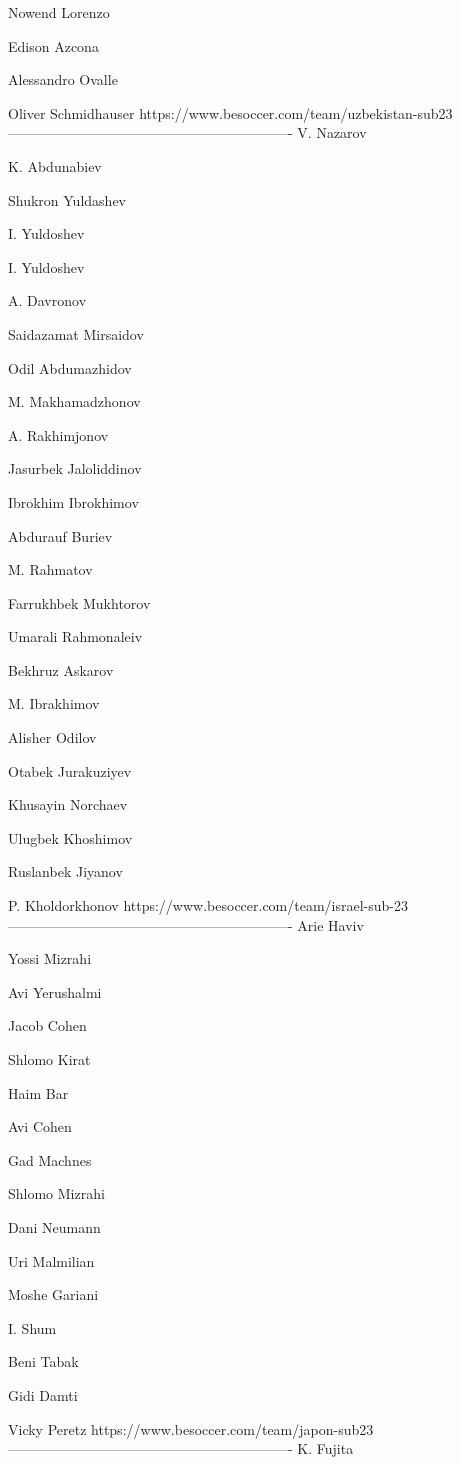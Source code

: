 Nowend Lorenzo

Edison Azcona

Alessandro Ovalle

Oliver Schmidhauser
https://www.besoccer.com/team/uzbekistan-sub23 
-------------------------------------------------------------
V. Nazarov

K. Abdunabiev

Shukron Yuldashev

I. Yuldoshev

I. Yuldoshev

A. Davronov

Saidazamat Mirsaidov

Odil Abdumazhidov

M. Makhamadzhonov

A. Rakhimjonov

Jasurbek Jaloliddinov

Ibrokhim Ibrokhimov

Abdurauf Buriev

M. Rahmatov

Farrukhbek Mukhtorov

Umarali Rahmonaleiv

Bekhruz Askarov

M. Ibrakhimov

Alisher Odilov

Otabek Jurakuziyev

Khusayin Norchaev

Ulugbek Khoshimov

Ruslanbek Jiyanov

P. Kholdorkhonov
https://www.besoccer.com/team/israel-sub-23 
-------------------------------------------------------------
Arie Haviv

Yossi Mizrahi

Avi Yerushalmi

Jacob Cohen

Shlomo Kirat

Haim Bar

Avi Cohen

Gad Machnes

Shlomo Mizrahi

Dani Neumann

Uri Malmilian

Moshe Gariani

I. Shum

Beni Tabak

Gidi Damti

Vicky Peretz
https://www.besoccer.com/team/japon-sub23 
-------------------------------------------------------------
K. Fujita

